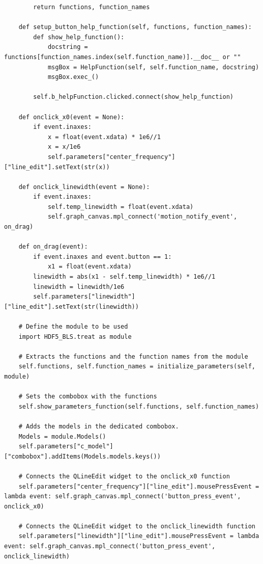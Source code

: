\documentclass{book}
\begin{document}
\begin{enumerate}
\begin{lstlisting}
        return functions, function_names

    def setup_button_help_function(self, functions, function_names):
        def show_help_function():
            docstring = functions[function_names.index(self.function_name)].__doc__ or ""
            msgBox = HelpFunction(self, self.function_name, docstring)
            msgBox.exec_()

        self.b_helpFunction.clicked.connect(show_help_function)

    def onclick_x0(event = None):
        if event.inaxes:
            x = float(event.xdata) * 1e6//1
            x = x/1e6
            self.parameters["center_frequency"]["line_edit"].setText(str(x))
    
    def onclick_linewidth(event = None):
        if event.inaxes:
            self.temp_linewidth = float(event.xdata)
            self.graph_canvas.mpl_connect('motion_notify_event', on_drag)

    def on_drag(event):
        if event.inaxes and event.button == 1:
            x1 = float(event.xdata)
        linewidth = abs(x1 - self.temp_linewidth) * 1e6//1
        linewidth = linewidth/1e6
        self.parameters["linewidth"]["line_edit"].setText(str(linewidth))

    # Define the module to be used 
    import HDF5_BLS.treat as module 

    # Extracts the functions and the function names from the module
    self.functions, self.function_names = initialize_parameters(self, module)

    # Sets the combobox with the functions
    self.show_parameters_function(self.functions, self.function_names)

    # Adds the models in the dedicated combobox.
    Models = module.Models()
    self.parameters["c_model"]["combobox"].addItems(Models.models.keys())

    # Connects the QLineEdit widget to the onclick_x0 function
    self.parameters["center_frequency"]["line_edit"].mousePressEvent = lambda event: self.graph_canvas.mpl_connect('button_press_event', onclick_x0)
    
    # Connects the QLineEdit widget to the onclick_linewidth function
    self.parameters["linewidth"]["line_edit"].mousePressEvent = lambda event: self.graph_canvas.mpl_connect('button_press_event', onclick_linewidth)


\end{lstlisting}
\end{enumerate}
\end{document}
